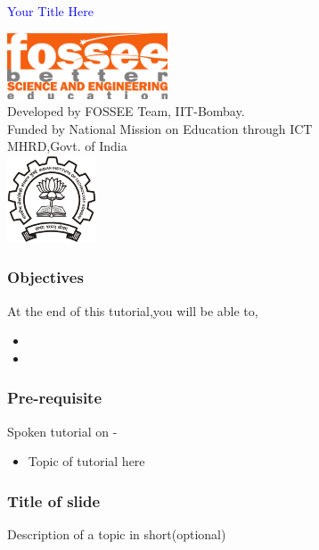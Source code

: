 \documentclass[presentation]{beamer}
\title{}
\author{FOSSEE}
\date{}
\begin{document}
\begin{frame}

\begin{center}
\vspace{12pt}
\textcolor{blue}{\huge Your Title Here}
\end{center}
\vspace{18pt}
\begin{center}
\vspace{10pt}
\includegraphics[scale=0.95]{../images/fossee-logo.png}\\
\vspace{5pt}
\scriptsize Developed by FOSSEE Team, IIT-Bombay. \\ 
\scriptsize Funded by National Mission on Education through ICT\\
\scriptsize  MHRD,Govt. of India\\
\includegraphics[scale=0.30]{../images/iitb-logo.png}\\
\end{center}
\end{frame}
\begin{frame}
\frametitle{Objectives}
\label{sec-2}

At the end of this tutorial,you will be able to,
\begin{itemize}
\item 
\item  
\end{itemize}
\end{frame}
\begin{frame}
\frametitle{Pre-requisite}
\label{sec-3}

Spoken tutorial on -
\begin{itemize}
\item Topic of tutorial here
\end{itemize}
\end{frame}
\begin{frame}
\frametitle{Title of slide}
\label{sec-4}

  Description of a topic in short(optional)
\end{frame}
\end{document}
